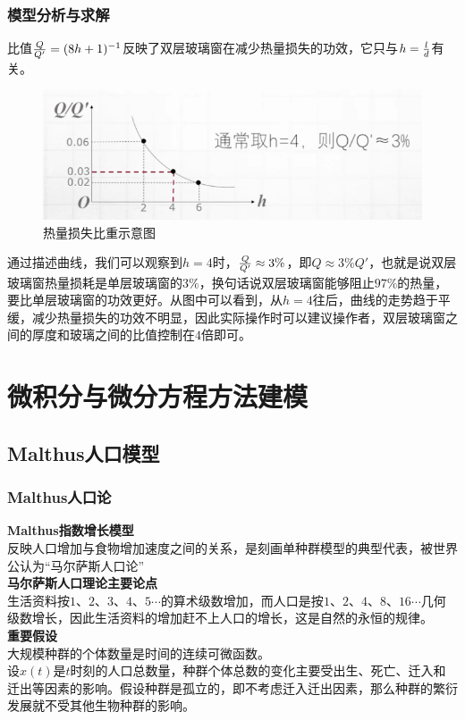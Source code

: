 \documentclass[openany]{progbookcn}
\begin{document}
\subsection{模型分析与求解}
\indent 比值${Q\over Q'}=(8h+1)^{-1}$反映了双层玻璃窗在减少热量损失的功效，它只与$h={l\over d}$有关。
\begin{figure}[H]
\centering
\includegraphics[width=0.6 \textwidth]{figs/chapter3/热量损失比重}
\caption{热量损失比重示意图}
\end{figure}
\indent 通过描述曲线，我们可以观察到$h=4$时，${Q\over Q'}\approx 3\%$，即$Q\approx 3\% Q'$，也就是说双层玻璃窗热量损耗是单层玻璃窗的$3\%$，换句话说双层玻璃窗能够阻止$97\%$的热量，要比单层玻璃窗的功效更好。从图中可以看到，从$h=4$往后，曲线的走势趋于平缓，减少热量损失的功效不明显，因此实际操作时可以建议操作者，双层玻璃窗之间的厚度和玻璃之间的比值控制在$4$倍即可。

\chapter{微积分与微分方程方法建模}
\section{Malthus人口模型}
\subsection{Malthus人口论}
\noindent \textbf{Malthus指数增长模型}\\
\indent 反映人口增加与食物增加速度之间的关系，是刻画单种群模型的典型代表，被世界公认为“马尔萨斯人口论”\\
\noindent \textbf{马尔萨斯人口理论主要论点}\\
\indent 生活资料按$1、2、3、4、5\cdots$的算术级数增加，而人口是按$1、2、4、8、16\cdots$几何级数增长，因此生活资料的增加赶不上人口的增长，这是自然的永恒的规律。\\
\noindent \textbf{重要假设}\\
\indent 大规模种群的个体数量是时间的连续可微函数。\\
\indent 设$x(t)$是$t$时刻的人口总数量，种群个体总数的变化主要受出生、死亡、迁入和迁出等因素的影响。假设种群是孤立的，即不考虑迁入迁出因素，那么种群的繁衍发展就不受其他生物种群的影响。
\end{document}
